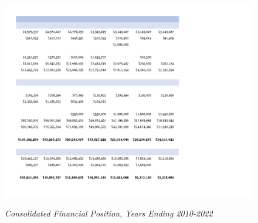 \begin{figure}[hbt]
    \caption[Consolidated Financial Position, Years Ending 2010–2022]{\textit{Consolidated Financial Position, Years Ending 2010-2022}}\label{fig:consolidated_financial_position_2010-2022} %
    \includegraphics[width=\textwidth]{Consolidated Financial Statements/v5 Spreadsheets/Consolidated_Financial_Position_Years_2010-2022 PDF pages/.pg_0004}\\ %
\end{figure}

